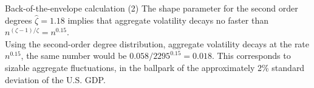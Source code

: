 \documentclass[dvipsnames]{beamer}
\begin{document}

\begin{frame}{Back-of-the-envelope calculation (2)}
    \justifying
    The shape parameter for the second order degrees $\hat{\zeta} = 1.18$
    implies that aggregate volatility decays no faster than $n^{(\zeta-1) / \zeta} = n^{0.15}$. \\[10pt]
    
    Using the second-order degree distribution,
    aggregate volatility decays at the rate $n^{0.15}$, the same number would be
    $0.058/2295^{0.15}=0.018$. This corresponds to sizable aggregate fluctuations, in
    the ballpark of the approximately 2\% standard deviation of the U.S. GDP.
\end{frame}
\end{document}

